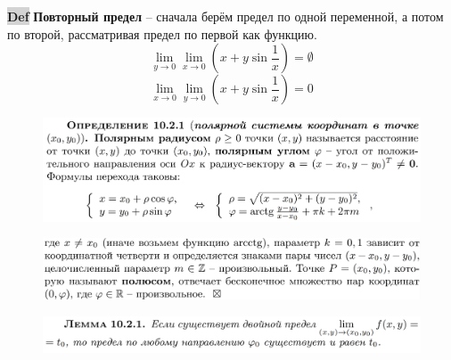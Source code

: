 \documentclass{article}
\newcommand{\bb}{\textbf}
\begin{document}
{\bfseries\colorbox{lightgray}{Def}} \bb{Повторный предел} -- сначала берём предел по одной переменной, а потом по второй, рассматривая предел по первой как функцию.
    $$\lim\limits_{y\to 0}\lim\limits_{x\to 0} \left( x+y \sin\frac{1}{x} \right) = \emptyset$$
    $$\lim\limits_{x\to 0}\lim\limits_{y \to 0}\left( x + y \sin \frac{1}{x} \right) = 0 $$

\newpage
\begin{figure}[h!]
    \centering
    \includegraphics[width=\textwidth]{17.png}
    \vspace{-1cm}
\end{figure}
\begin{figure}[h!]
    \centering
    \includegraphics[width=\textwidth]{18.png}
    \vspace{-1cm}
\end{figure}
\begin{figure}[h!]
    \centering
    \vspace{-1cm}
\end{figure}
\begin{figure}[h!]
    \centering
    \includegraphics[width=\textwidth]{20.png}
    \vspace{-1cm}
\end{figure}
\end{document}
